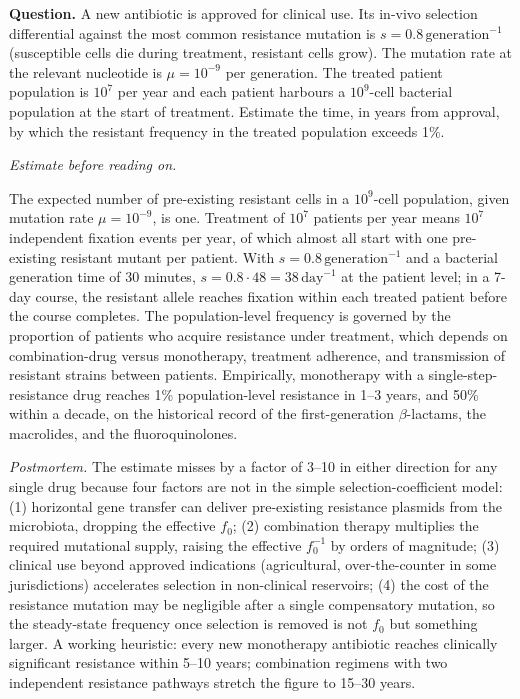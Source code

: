\begin{estimation}
\textbf{Question.} A new antibiotic is approved for clinical use.
Its in-vivo selection differential against the most common resistance
mutation is $s = 0.8\,\text{generation}^{-1}$ (susceptible cells die
during treatment, resistant cells grow). The mutation rate at the
relevant nucleotide is $\mu = 10^{-9}$ per generation. The treated
patient population is $10^7$ per year and each patient harbours a
$10^9$-cell bacterial population at the start of treatment. Estimate
the time, in years from approval, by which the resistant frequency in
the treated population exceeds 1\%.

\smallskip
\textit{Estimate before reading on.}

\smallskip
The expected number of pre-existing resistant cells in a $10^9$-cell
population, given mutation rate $\mu = 10^{-9}$, is one. Treatment of
$10^7$ patients per year means $10^7$ independent fixation events
per year, of which almost all start with one pre-existing resistant
mutant per patient. With $s = 0.8\,\text{generation}^{-1}$ and a
bacterial generation time of 30 minutes, $s = 0.8 \cdot 48 =
38\,\text{day}^{-1}$ at the patient level; in a 7-day course,
the resistant allele reaches fixation within each treated patient
before the course completes. The population-level frequency is
governed by the proportion of patients who acquire resistance under
treatment, which depends on combination-drug versus monotherapy,
treatment adherence, and transmission of resistant strains between
patients. Empirically, monotherapy with a single-step-resistance drug
reaches 1\% population-level resistance in 1--3 years, and 50\%
within a decade, on the historical record of the first-generation
$\beta$-lactams, the macrolides, and the fluoroquinolones.

\smallskip
\textit{Postmortem.} The estimate misses by a factor of 3--10 in
either direction for any single drug because four factors are not
in the simple selection-coefficient model: (1) horizontal gene
transfer can deliver pre-existing resistance plasmids from the
microbiota, dropping the effective $f_0$; (2) combination therapy
multiplies the required mutational supply, raising the effective
$f_0^{-1}$ by orders of magnitude; (3) clinical use beyond approved
indications (agricultural, over-the-counter in some jurisdictions)
accelerates selection in non-clinical reservoirs; (4) the cost of
the resistance mutation may be negligible after a single
compensatory mutation, so the steady-state frequency once
selection is removed is not $f_0$ but something larger. A working
heuristic: every new monotherapy antibiotic reaches clinically
significant resistance within 5--10 years; combination regimens
with two independent resistance pathways stretch the figure to
15--30 years.
\end{estimation}

